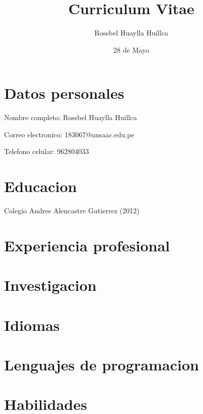 \documentclass[11pt,letterpaper]{article}
\author{Rossbel Huaylla Huillca}
\title{Curriculum Vitae}
\date {28 de Mayo}
\begin{document}

\maketitle %
\section{Datos personales}
Nombre completo: Rossbel Huaylla Huillca

Correo electronico: 183067@unsaac.edu.pe

Telefono celular: 962804033

\section{Educacion}
Colegio Andres Alencastre Gutierrez (2012)

\section{Experiencia profesional}

\section{Investigacion}

\section{Idiomas}

\section{Lenguajes de programacion}

\section{Habilidades}
\end{document}
